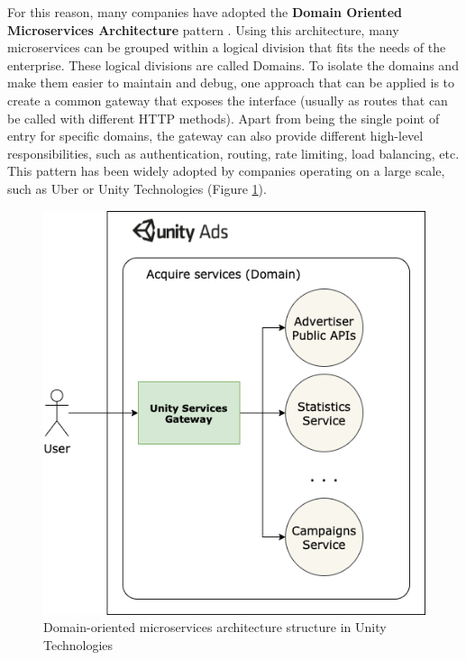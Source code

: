 \documentclass[12pt]{article}
\begin{document}
For this reason, many companies have adopted the \textbf{Domain Oriented Microservices Architecture} pattern \cite{DOMAUber}. Using this architecture, many microservices can be grouped within a logical division that fits the needs of the enterprise. These logical divisions are called Domains. To isolate the domains and make them easier to maintain and debug, one approach that can be applied is to create a common gateway that exposes the interface (usually as routes that can be called with different HTTP methods). Apart from being the single point of entry for specific domains, the gateway can also provide different high-level responsibilities, such as authentication, routing, rate limiting, load balancing, etc. This pattern has been widely adopted by companies operating on a large scale, such as Uber \cite{GatewayUber} or Unity Technologies (Figure \ref{fig:unity-acquire-domain}).\\

\begin{figure}[h]
    \centering
    \includegraphics[scale=0.3]{src/proposal/img/unity-services-diagram.png}
    \caption{Domain-oriented microservices architecture structure in Unity Technologies}
    \label{fig:unity-acquire-domain}
\end{figure}
\end{document}
